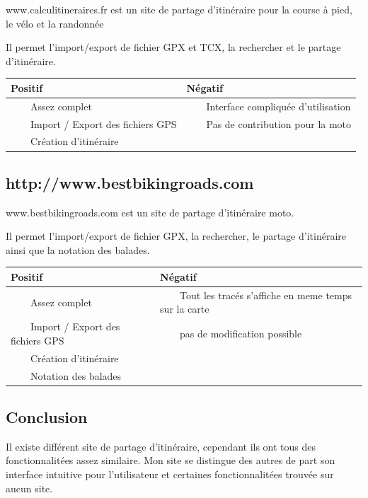 \documentclass[a4paper]{article}
\newcommand{\tabitem}{~~\llap{\textbullet}~~}
\begin{document}
www.calculitineraires.fr est un site de partage d'itinéraire pour la course à pied, le vélo et la randonnée

Il permet l'import/export de fichier GPX et TCX, la rechercher et le partage d'itinéraire.

\begin{tabular}{|l|l|}
	\hline
	Positif                                   & Négatif                                     \\ \hline\hline
	\tabitem Assez complet                    & \tabitem Interface compliquée d'utilisation \\
	\tabitem Import / Export des fichiers GPS & \tabitem Pas de contribution pour la moto   \\
	\tabitem Création d'itinéraire            &                                             \\ \hline
\end{tabular}


\subsection{http://www.bestbikingroads.com}
www.bestbikingroads.com est un site de partage d'itinéraire moto.


Il permet l'import/export de fichier GPX, la rechercher, le partage d'itinéraire ainsi que la notation des balades.

\begin{tabular}{|l|l|}
	\hline
	Positif                                   & Négatif                                                       \\ \hline\hline
	\tabitem Assez complet                    & \tabitem Tout les tracés s'affiche en meme temps sur la carte \\
	\tabitem Import / Export des fichiers GPS & \tabitem pas de modification possible                         \\
	\tabitem Création d'itinéraire            &                                                               \\
	\tabitem Notation des balades             &                                                               \\ \hline
\end{tabular}

\subsection{Conclusion}
Il existe différent site de partage d'itinéraire, cependant ils ont tous des fonctionnalitées assez similaire. Mon site se distingue des autres de part son interface intuitive pour l'utilisateur et certaines fonctionnalitées trouvée sur aucun site.
\end{document}
